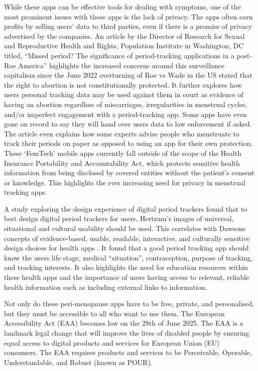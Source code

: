 While these apps can be effective tools for dealing with symptoms, one of the most prominent issues with these apps is the lack of privacy. The apps often earn profits by selling users’ data to third parties, even if there is a promise of privacy advertised by the companies\cite{Gilman2021}. An article by the Director of Research for Sexual and Reproductive Health and Rights, Population Institute in Washington, DC titled, “Missed period? The significance of period-tracking applications in a post-Roe America” highlights the increased concerns around this surveillance capitalism since the June 2022 overturning of Roe vs Wade in the US stated that the right to abortion is not constitutionally protected\cite{CoenSanchez2022}. It further explores how users personal tracking data may be used against them in court as evidence of having an abortion regardless of miscarriages, irregularities in menstrual cycles, and/or imperfect engagement with a period-tracking app. Some apps have even gone on record to say they will hand over users data to law enforcement if asked. The article even explains how some experts advise people who menstruate to track their periods on paper as opposed to using an app for their own protection. These `FemTech' mobile apps currently fall outside of the scope of the Health Insurance Portability and Accountability Act, which protects sensitive health information from being disclosed by covered entities without the patient’s consent or knowledge\cite{OCR2022}. This highlights the ever increasing need for privacy in menstrual tracking apps. 

A study\cite{Chan2019} exploring the design experience of digital period trackers found that to best design digital period trackers for users, Hertzum’s images of universal, situational and cultural usability should be used. This correlates with Dawsons concepts of evidence-based, usable, readable, interactive, and culturally sensitive design choices for health apps \cite{Dawson2020}. It found that a good period tracking app should know the users life stage, medical “situation”, contraception, purpose of tracking, and tracking interests. It also highlights the need for education resources within these health apps and the importance of users having access to relevant, reliable health information such as including external links to information. 

Not only do these peri-menopause apps have to be free, private, and personalised, but they must be accessible to all who want to use them. The European Accessibility Act (EAA) becomes law on the 28th of June 2025. The EAA is a landmark legal change that will improve the lives of disabled people by ensuring equal access to digital products and services for European Union (EU) consumers\cite{AbilityNet2024}. The EAA requires products and services to be Perceivable, Operable, Understandable, and Robust (known as POUR). 

